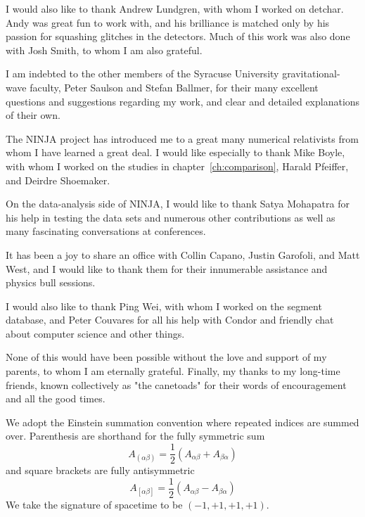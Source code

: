 \documentclass[12pt,notitlepage]{report}
\begin{document}
I would also like to thank Andrew Lundgren, with whom I worked on
detchar.  Andy was great fun to work with, and his brilliance is
matched only by his passion for squashing glitches in the detectors.
Much of this work was also done with Josh Smith, to whom I am also
grateful.

I am indebted to the other members of the Syracuse University
gravitational-wave faculty, Peter Saulson and Stefan Ballmer, for their
many excellent questions and suggestions regarding my work, and clear
and detailed explanations of their own.

The NINJA project has introduced me to a great many numerical
relativists from whom I have learned a great deal.  I would like
especially to thank Mike Boyle, with whom I worked on the studies in
chapter~\ref{ch:comparison}, Harald Pfeiffer, and Deirdre Shoemaker.

On the data-analysis side of NINJA, I would like to thank Satya
Mohapatra for his help in testing the data sets and numerous other
contributions as well as many fascinating conversations at
conferences.

It has been a joy to share an office with Collin Capano, Justin
Garofoli, and Matt West, and I would like to thank them for their
innumerable assistance and physics bull sessions.

I would also like to thank Ping Wei, with whom I worked on the segment
database, and Peter Couvares for all his help with Condor and friendly
chat about computer science and other things.

None of this would have been possible without the love and support of
my parents, to whom I am eternally grateful.  Finally, my thanks to my
long-time friends, known collectively as "the canetoads" for their
words of encouragement and all the good times.



We adopt the Einstein summation convention where repeated indices are
summed over.  Parenthesis are shorthand for the fully symmetric sum
%
\begin{equation*}
A_{(\alpha\beta)}
= \frac{1}{2} \left(A_{\alpha\beta} 
+ A_{\beta\alpha} \right)
\end{equation*}
%
and square brackets are fully antisymmetric
%
\begin{equation*}
A_{[\alpha\beta]}
= \frac{1}{2} \left(A_{\alpha\beta} 
- A_{\beta\alpha} \right)
\end{equation*}
%
We take the signature of spacetime to be $(-1,+1,+1,+1)$.
\end{document}
